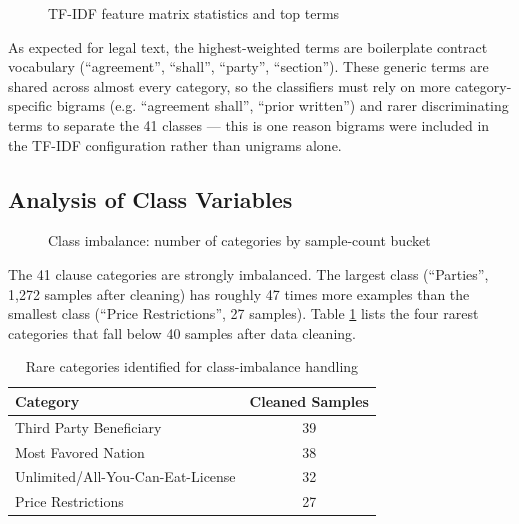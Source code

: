 \documentclass[12pt, a4paper]{report}
\begin{document}
\begin{figure}[h]
\centering
{}
\caption{TF-IDF feature matrix statistics and top terms}
\label{fig:tfidf_stats}
\end{figure}

As expected for legal text, the highest-weighted terms are boilerplate contract vocabulary (``agreement'', ``shall'', ``party'', ``section''). These generic terms are shared across almost every category, so the classifiers must rely on more category-specific bigrams (e.g. ``agreement shall'', ``prior written'') and rarer discriminating terms to separate the 41 classes — this is one reason bigrams were included in the TF-IDF configuration rather than unigrams alone.

\subsection{Analysis of Class Variables}
\label{subsec:class_analysis}
\begin{figure}[h]
\centering
{}
\caption{Class imbalance: number of categories by sample-count bucket}
\label{fig:class_imbalance_bins}
\end{figure}

The 41 clause categories are strongly imbalanced. The largest class (``Parties'', 1,272 samples after cleaning) has roughly 47 times more examples than the smallest class (``Price Restrictions'', 27 samples). Table \ref{tab:rare_categories} lists the four rarest categories that fall below 40 samples after data cleaning.

\begin{table}[h]
\centering
\small
\begin{tabular}{lc}
\toprule
Category & Cleaned Samples \\
\hline
Third Party Beneficiary & 39 \\
Most Favored Nation & 38 \\
Unlimited/All-You-Can-Eat-License & 32 \\
Price Restrictions & 27 \\
\bottomrule
\end{tabular}
\caption{Rare categories identified for class-imbalance handling}
\label{tab:rare_categories}
\end{table}
\end{document}
